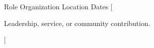 

\begin{cventries}

  \cventry
    {Role} %
    {Organization} %
    {Location} %
    {Dates} %
    [
      \begin{cvitems}
        \item {Leadership, service, or community contribution.}
      \end{cvitems}
    ]

\end{cventries}
